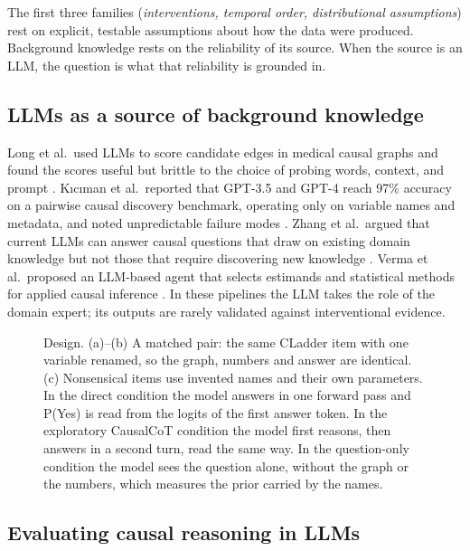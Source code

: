 \documentclass{llncs}
\begin{document}
The first three families (\emph{interventions, temporal order, distributional assumptions}) rest on explicit, testable assumptions about how the data were produced. Background knowledge rests on the reliability of its source. When the source is an LLM, the question is what that reliability is grounded in.

\subsection{LLMs as a source of background knowledge}
\label{sec:llm-bk}

Long et al.\ used LLMs to score candidate edges in medical causal graphs and found the scores useful but brittle to the choice of probing words, context, and prompt \cite{long2023can}. Kıcıman et al.\ reported that GPT-3.5 and GPT-4 reach 97\% accuracy on a pairwise causal discovery benchmark, operating only on variable names and metadata, and noted unpredictable failure modes \cite{kiciman2023causal}. Zhang et al.\ argued that current LLMs can answer causal questions that draw on existing domain knowledge but not those that require discovering new knowledge \cite{zhang2023understanding}. Verma et al.\ proposed an LLM-based agent that selects estimands and statistical methods for applied causal inference \cite{verma2025causal}. In these pipelines the LLM takes the role of the domain expert; its outputs are rarely validated against interventional evidence.

\begin{figure}[t]
  \centering
  
  \caption{Design. (a)--(b) A matched pair: the same CLadder item with one
  variable renamed, so the graph, numbers and answer are identical.
  (c) Nonsensical items use invented names and their own parameters.
  In the direct condition the model answers in one forward pass and
  P(Yes) is read from the logits of the first answer token. In the
  exploratory CausalCoT condition the model first reasons, then answers
  in a second turn, read the same way. In the question-only condition the
  model sees the question alone, without the graph or the numbers, which
  measures the prior carried by the names.}
  \label{fig:design}
\end{figure}

\subsection{Evaluating causal reasoning in LLMs}
\label{sec:eval}
\end{document}
